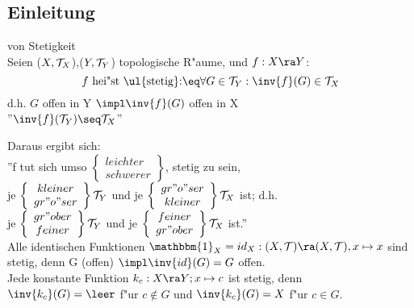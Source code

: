 \subsection{Einleitung}
\begin{definition}\label{4.1} von Stetigkeit\\
Seien ($X,\mathcal T_X$),($Y,\mathcal T_Y$) topologische R"aume, und $f:X\ra Y$:
$$f \mbox{ hei"st \ul{stetig}:}\eq \forall G\in\T_Y:\inv{f}(G)\in\T_X$$
d.h. $G$ offen in Y $\impl \inv{f}(G)$ offen in X\\
''$\inv{f}(\T_Y)\seq\T_X$''
\end{definition}
Daraus ergibt sich:\\
''f tut sich umso $\left\{\begin{array}{c}leichter\\schwerer\end{array}\right\}$, stetig zu sein,\\
je $\left\{\begin{array}{c}kleiner\\gr"o"ser\end{array}\right\}\mathcal T_Y$ und je $\left\{\begin{array}{c}gr"o"ser\\kleiner\end{array}\right\}\mathcal T_X$ ist; d.h.\\
je $\left\{\begin{array}{c}gr"ober\\feiner\end{array}\right\}\mathcal T_Y$ und je $\left\{\begin{array}{c}feiner\\gr"ober\end{array}\right\}\mathcal T_X$ ist.''\vspace*{1cm}\\
Alle identischen Funktionen $\mathbbm{1}_X = id_X:(X,\T )\ra (X,\T ), x\mapsto x$ sind stetig, denn G (offen) $\impl \inv{id}(G) = G$ offen.\\
Jede konstante Funktion $k_c:X\ra Y; x\mapsto c$ ist stetig, denn $\inv{k_c}(G) = \leer$ f"ur $c\notin G$ und $\inv{k_c}(G)=X$ f"ur $c\in G$.
